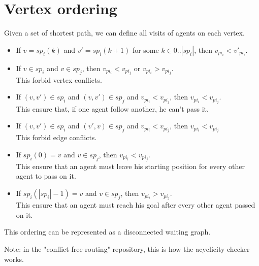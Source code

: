\section{Vertex ordering}\label{sec:vo}

Given a set of shortest path, we can define all visits of agents on each vertex.

\begin{itemize}
  \item If $v = sp_i(k)$ and $v' = sp_i(k+1)$ for some $k \in 0..|sp_i|$, then $v_{pi_i}<v'_{pi_i}$.
  \item If $v \in sp_i$ and $v \in sp_j$, then $v_{pi_i}<v_{pi_j}$ or $v_{pi_i}>v_{pi_j}$.
  \\ This forbid vertex conflicts.
  \item If $(v,v') \in sp_i$ and $(v,v') \in sp_j$ and $v_{pi_i} < v_{pi_j}$, then $v_{pi_i} < v_{pi_j}$. \\ This ensure that, if one agent follow another, he can't pass it.
  \item If $(v,v') \in sp_i$ and $(v',v) \in sp_j$ and $v_{pi_i} < v_{pi_j}$, then $v_{pi_i} < v_{pi_j}$ \\ This forbid edge conflicts.
  \item If $sp_i(0)=v$ and $v \in sp_j$, then $v_{pi_i} < v_{pi_j}$. \\ This ensure that an agent must leave his starting position for every other agent to pass on it.
  \item If $sp_i(|sp_i|-1)=v$ and $v \in sp_j$, then $v_{pi_i} > v_{pi_j}$. \\ This ensure that an agent must reach his goal after every other agent passed on it.
\end{itemize}

This ordering can be represented as a disconnected waiting graph.

Note: in the "conflict-free-routing" repository, this is how the acyclicity checker works.
